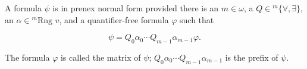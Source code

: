 A formula $\psi$ is in prenex normal form provided there is an $m \in \omega$, a $Q \in {}^m\{\forall, \exists\}$, an $\alpha \in {}^m\text{Rng } v$, and a quantifier-free formula $\varphi$ such that

$$\psi = Q_0\alpha_0 \cdots Q_{m-1}\alpha_{m-1}\varphi.$$

The formula $\varphi$ is called the matrix of $\psi$; $Q_0\alpha_0 \cdots Q_{m-1}\alpha_{m-1}$ is the prefix of $\psi$.
